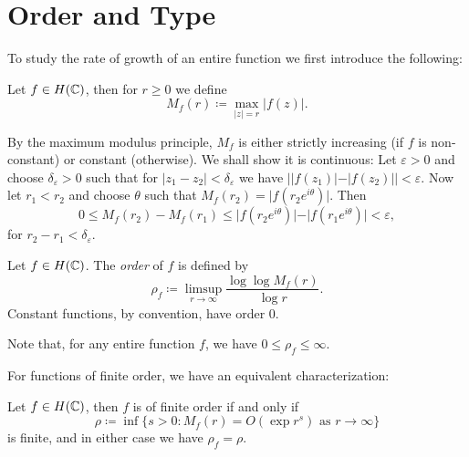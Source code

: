 \section{Order and Type}
\label{sec:order-type}

To study the rate of growth of an entire function we first introduce the following:
\begin{definition}
    Let $f \in H(\mathbb{C})$, then for $r \geq 0$ we define
    \begin{equation*}
        M_f(r) \coloneqq \max_{\vert z \vert = r} \vert f(z) \vert.
    \end{equation*}
\end{definition}

By the maximum modulus principle, $M_f$ is either strictly increasing (if $f$ is non-constant) or constant (otherwise). We shall show it is continuous: Let $\varepsilon > 0$ and choose $\delta_\varepsilon > 0$ such that for ${\vert z_1 - z_2 \vert < \delta_\varepsilon}$ we have ${\left\vert \vert f(z_1) \vert - \vert f(z_2) \vert \right\vert < \varepsilon}$. Now let $r_1 < r_2$ and choose $\theta$ such that $M_f(r_2) = \vert f(r_2 e^{i \theta}) \vert$. Then
\begin{equation*}
    0 \leq M_f(r_2) - M_f(r_1) \leq \vert f(r_2 e^{i \theta}) \vert - \vert f(r_1 e^{i \theta}) \vert < \varepsilon,
\end{equation*}
for $r_2 - r_1 < \delta_\varepsilon$.

\begin{definition} \label{def:order}
    Let $f \in H(\mathbb{C})$. The \emph{order} of $f$ is defined by
    \begin{equation} \label{eq:def-order}
        \rho_f \coloneqq \limsup_{r \to \infty} \frac{\log \log M_f(r)}{\log r}.
    \end{equation}
    Constant functions, by convention, have order 0.
\end{definition}

Note that, for any entire function $f$, we have $0 \leq \rho_f \leq \infty$.

For functions of finite order, we have an equivalent characterization:

\begin{proposition} \label{prop:order-infimum}
    Let $f \in H(\mathbb{C})$, then $f$ is of finite order if and only if
    \begin{equation}
        \rho \coloneqq \inf \{ s > 0 : M_f(r) = O(\exp r^s) \textrm{ as } r \to \infty \}
    \end{equation}
    is finite, and in either case we have $\rho_f = \rho$.
\end{proposition}

